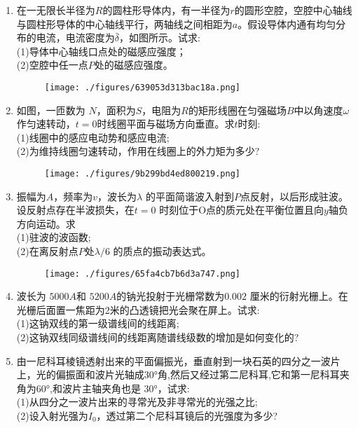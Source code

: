 \begin{enumerate}
(2)球心的电势。
\begin{figure}[ht]
\centering
\texttt{[image: ./figures/d094283bd00426b3.png]}
\caption{} \label{fig_XD08_3}
\end{figure}
\item 在一无限长半径为$R$的圆柱形导体内，有一半径为$r$的圆形空腔，空腔中心轴线与圆柱形导体的中心轴线平行，两轴线之间相距为$a$。假设导体内通有均匀分布的电流，电流密度为$\bar \delta$，如图所示。试求:\\
(1)导体中心轴线口点处的磁感应强度；\\
(2)空腔中任一点$P$处的磁感应强度。
\begin{figure}[ht]
\centering
\texttt{[image: ./figures/639053d313bac18a.png]}
\caption{} \label{fig_XD08_4}
\end{figure}
\item 如图，一匝数为 $N$，面积为$ S$，电阻为$ R$的矩形线圈在匀强磁场$ B$中以角速度$\omega$作匀速转动，$t=0$时线圈平面与磁场方向垂直。求$t$时刻:\\
(1)线圈中的感应电动势和感应电流;\\
(2)为维持线圈匀速转动，作用在线圈上的外力矩为多少?
\begin{figure}[ht]
\centering
\texttt{[image: ./figures/9b299bd4ed800219.png]}
\caption{} \label{fig_XD08_5}
\end{figure}
\item 振幅为$A$，频率为$v$，波长为$\lambda$ 的平面简谐波入射到$P$点反射，以后形成驻波。设反射点存在半波损失，在$t=0$ 时刻位于O点的质元处在平衡位置且向$y$轴负方向运动。求\\
(1)驻波的波函数;\\
(2)在离反射点$P$处$\lambda/6$ 的质点的振动表达式。
\begin{figure}[ht]
\centering
\texttt{[image: ./figures/65fa4cb7b6d3a747.png]}
\caption{} \label{fig_XD08_6}
\end{figure}
\item 波长为 $5000A $和 $5200A$的钠光投射于光栅常数为$ 0.002$ 厘米的衍射光栅上。在光栅后面置一焦距为2米的凸透镜把光会聚在屏上。试求:\\
(1)这钠双线的第一级谱线间的线距离;\\
(2)这钠双线同级谱线间的线距离随谱线级数的增加是如何变化的?
\item 由一尼科耳棱镜透射出来的平面偏振光，垂直射到一块石英的四分之一波片上，光的偏振面和波片光轴成30°角,然后又经过第二尼科耳,它和第一尼科耳夹角为60°,和波片主轴夹角也是 30°，试求:\\
(1)从四分之一波片出来的寻常光及非寻常光的光强之比;\\
(2)设入射光强为$I_0$，透过第二个尼科耳镜后的光强度为多少?
\end{enumerate}